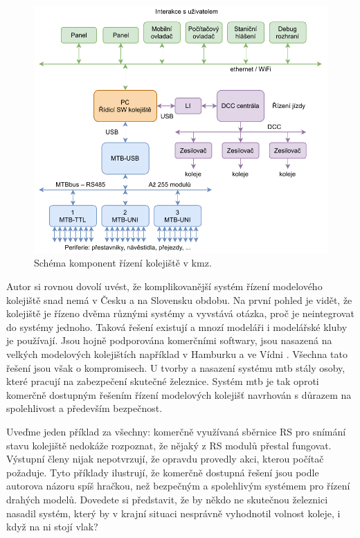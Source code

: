 \begin{figure}[ht]
\includegraphics[width=\textwidth]{data/railroad-topology.pdf}
\caption{Schéma komponent řízení kolejiště v \gls{kmz}.}
\label{fig:railroad-topology}
\end{figure}

Autor si rovnou dovolí uvést, že komplikovanější systém řízení modelového
kolejiště snad nemá v Česku a na Slovensku obdobu. Na první pohled je vidět,
že kolejiště je řízeno dvěma různými systémy a vyvstává otázka, proč je
neintegrovat do systémy jednoho. Taková řešení existují a mnozí modeláři
i modelářské kluby je používají. Jsou hojně podporována komerčními softwary,
jsou nasazená na velkých modelových kolejištích například v Hamburku a ve Vídni
\cite{}. Všechna tato řešení jsou však o kompromisech. U tvorby a nasazení
systému \gls{mtb} stály osoby, které pracují na zabezpečení skutečné železnice.
Systém \gls{mtb} je tak oproti komerčně dostupným řešením řízení modelových
kolejišť navrhován s důrazem na spolehlivost a především bezpečnost.

Uveďme jeden příklad za všechny: komerčně využívaná sběrnice RS pro snímání
stavu kolejiště nedokáže rozpoznat, že nějaký z RS modulů přestal fungovat.
Výstupní členy nijak nepotvrzují, že opravdu provedly akci, kterou počítač
požaduje. Tyto příklady ilustrují, že komerčně dostupná řešení jsou podle
autorova názoru spíš hračkou, než bezpečným a spolehlivým systémem pro řízení
drahých modelů. Dovedete si představit, že by někdo ne skutečnou železnici
nasadil systém, který by v krajní situaci nesprávně vyhodnotil volnost koleje,
i když na ni stojí vlak?

